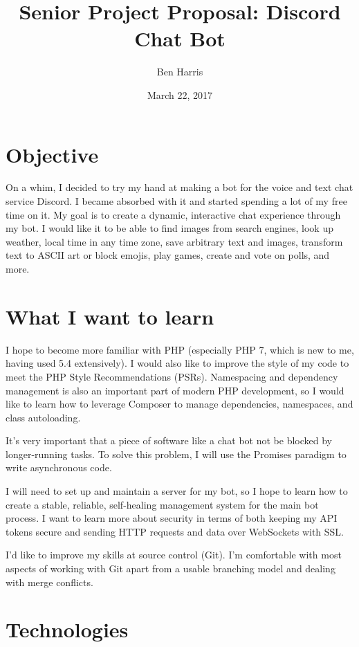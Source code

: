 \documentclass[11pt]{article}
\title{Senior Project Proposal: Discord Chat Bot}
\date{March 22, 2017}
\author{Ben Harris}
\begin{document}
    \maketitle

    \section{Objective}

        On a whim, I decided to try my hand at making a bot for the voice and text chat service Discord. I became absorbed with it and started spending a lot of my free time on it. My goal is to create a dynamic, interactive chat experience through my bot. I would like it to be able to find images from search engines, look up weather, local time in any time zone, save arbitrary text and images, transform text to ASCII art or block emojis, play games, create and vote on polls, and more.


    \section{What I want to learn}

        I hope to become more familiar with PHP (especially PHP 7, which is new to me, having used 5.4 extensively). I would also like to improve the style of my code to meet the PHP Style Recommendations (PSRs). Namespacing and dependency management is also an important part of modern PHP development, so I would like to learn how to leverage Composer to manage dependencies, namespaces, and class autoloading.

        It's very important that a piece of software like a chat bot not be blocked by longer-running tasks. To solve this problem, I will use the Promises paradigm to write asynchronous code.

        I will need to set up and maintain a server for my bot, so I hope to learn how to create a stable, reliable, self-healing management system for the main bot process. I want to learn more about security in terms of both keeping my API tokens secure and sending HTTP requests and data over WebSockets with SSL.

        I'd like to improve my skills at source control (Git). I'm comfortable with most aspects of working with Git apart from a usable branching model and dealing with merge conflicts.



    \section{Technologies}
\end{document}
